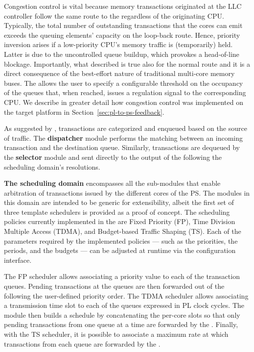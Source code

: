 Congestion control is vital because memory transactions originated
at the LLC controller follow the same route to the \schim regardless
of the originating CPU. Typically, the total number of outstanding
transactions that the cores can emit exceeds the queuing elements' capacity on the loop-back route. Hence, priority inversion arises if a low-priority CPU's memory traffic is (temporarily) held. Latter is due to the uncontrolled queue buildup, which provokes a head-of-line blockage. Importantly, what described is true also for the normal
route and it is a direct consequence of the best-effort nature of
traditional multi-core memory buses. The \schim allows the user to
specify a configurable threshold on the occupancy of the queues that,
when reached, issues a regulation signal to the corresponding CPU. We
describe in greater detail how congestion control was implemented on
the target platform in Section~\ref{sec:pl-to-ps-feedback}.

As suggested by , transactions are
categorized and enqueued based on the source of traffic. The {\bf
  dispatcher} module performs the matching between an incoming
transaction and the destination queue. Similarly, transactions are
dequeued by the {\bf selector} module and sent directly to the output
of the \schim following the scheduling domain's resolutions.

\par{\bf The scheduling domain} encompasses all the sub-modules that
enable arbitration of transactions issued by the different cores of
the PS. The modules in this domain are intended to be generic for
extensibility, albeit the first set of three template schedulers is
provided as a proof of concept.  The scheduling policies currently
implemented in the \schim are Fixed Priority (FP), Time Division
Multiple Access (TDMA), and Budget-based Traffic Shaping (TS).  Each
of the parameters required by the implemented policies --- such as the
priorities, the periods, and the budgets --- can be adjusted at
runtime via the configuration interface.

The FP scheduler allows associating a priority value to each of the
transaction queues. Pending transactions at the queues are then
forwarded out of the \schim following the user-defined priority
order. The TDMA scheduler allows associating a transmission time slot
to each of the queues expressed in PL clock cycles. The module then
builds a schedule by concatenating the per-core slots so that only
pending transactions from one queue at a time are forwarded by the
\schim. Finally, with the TS scheduler, it is possible to associate a
maximum rate at which transactions from each queue are forwarded by
the \schim.


